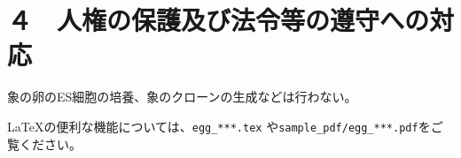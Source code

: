 \documentclass[11pt,a4j,dvipdfmx]{jarticle} 					%
\newcommand{\研究課題名}{象の卵}
\newcommand{\研究機関名}{逢坂大学}
\newcommand{\研究代表者氏名}{湯川秀樹}
\begin{document}



\section{４　人権の保護及び法令等の遵守への対応}

	象の卵のES細胞の培養、象のクローンの生成などは行わない。

	\LaTeX の便利な機能については、\texttt{egg\_***.tex} や\texttt{sample\_pdf/egg\_***.pdf}をご覧ください。



\end{document}
